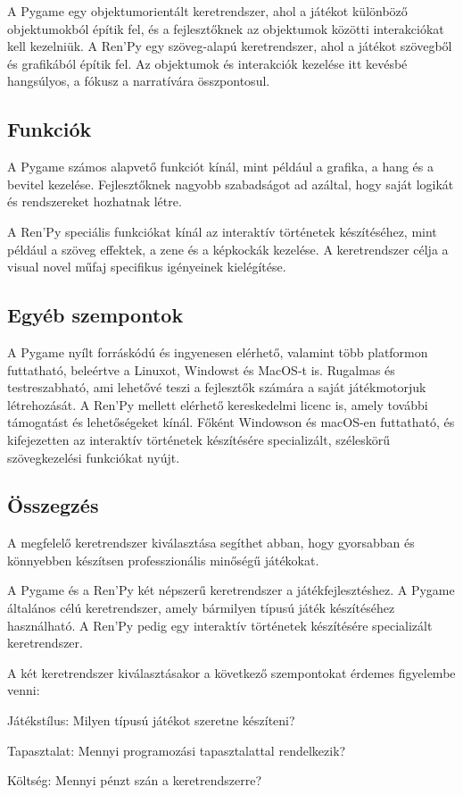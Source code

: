 A Pygame egy objektumorientált keretrendszer, ahol a játékot különböző objektumokból építik fel, és a fejlesztőknek az objektumok közötti interakciókat kell kezelniük.
A Ren'Py egy szöveg-alapú keretrendszer, ahol a játékot szövegből és grafikából építik fel. Az objektumok és interakciók kezelése itt kevésbé hangsúlyos, a fókusz a narratívára összpontosul.

\subsection{Funkciók}

A Pygame számos alapvető funkciót kínál, mint például a grafika, a hang és a bevitel kezelése. Fejlesztőknek nagyobb szabadságot ad azáltal, hogy saját logikát és rendszereket hozhatnak létre.

A Ren'Py speciális funkciókat kínál az interaktív történetek készítéséhez, mint például a szöveg effektek, a zene és a képkockák kezelése. A keretrendszer célja a visual novel műfaj specifikus igényeinek kielégítése.

\subsection{Egyéb szempontok}

A Pygame nyílt forráskódú és ingyenesen elérhető, valamint több platformon futtatható, beleértve a Linuxot, Windowst és MacOS-t is. Rugalmas és testreszabható, ami lehetővé teszi a fejlesztők számára a saját játékmotorjuk létrehozását.
A Ren'Py mellett elérhető kereskedelmi licenc is, amely további támogatást és lehetőségeket kínál. Főként Windowson és macOS-en futtatható, és kifejezetten az interaktív történetek készítésére specializált, széleskörű szövegkezelési funkciókat nyújt.

\subsection{Összegzés}
A megfelelő keretrendszer kiválasztása segíthet abban, hogy gyorsabban és könnyebben készítsen professzionális minőségű játékokat.

A Pygame és a Ren'Py két népszerű keretrendszer a játékfejlesztéshez. A Pygame általános célú keretrendszer, amely bármilyen típusú játék készítéséhez használható. A Ren'Py pedig egy interaktív történetek készítésére specializált keretrendszer.

A két keretrendszer kiválasztásakor a következő szempontokat érdemes figyelembe venni:

Játékstílus: Milyen típusú játékot szeretne készíteni?

Tapasztalat: Mennyi programozási tapasztalattal rendelkezik?

Költség: Mennyi pénzt szán a keretrendszerre?


